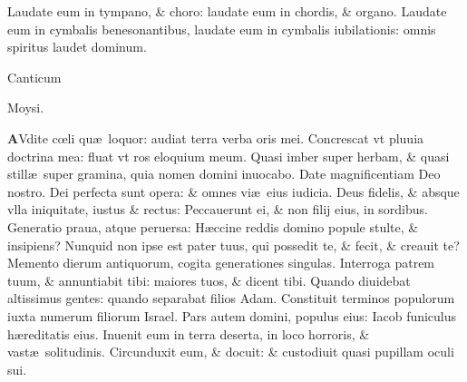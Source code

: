 \documentclass[a5paper,10pt]{book}
\def\ae{æ}
\def\oe{œ}
\begin{document}
\begin{multicols*}{2}
\newline \color{red} L\color{black}audate eum in tympano, \& choro: laudate eum in chordis, \& organo.
\newline \color{red} L\color{black}audate eum in cymbalis benesonantibus, laudate eum in cymbalis iubilationis: omnis spiritus laudet dominum.
\vspace{-2.25em}
\begin{center} \color{red}
\hypertarget{Auditecoeli}{Canticum} Moysi.
\end{center}
\vspace{-1em}
\lettrine[lines=2]{\bfseries \color{red} A}{}Vdite c\oe li qu\ae \ loquor: audiat terra verba oris mei.
\newline \color{red} C\color{black}oncrescat vt pluuia doctrina mea: fluat vt ros eloquium meum.
\newline \color{red} Q\color{black}uasi imber super herbam, \& quasi still\ae \ super gramina, quia nomen domini inuocabo.
\newline \color{red} D\color{black}ate magnificentiam Deo nostro. Dei perfecta sunt opera: \& omnes vi\ae \ eius iudicia.
\newline \color{red} D\color{black}eus fidelis, \& absque vlla iniquitate, iustus \& rectus: Peccauerunt ei, \& non filij eius, in sordibus.
\newline \color{red} G\color{black}eneratio praua, atque peruersa: H\ae ccine reddis domino popule stulte, \& insipiens?
\newline \color{red} N\color{black}unquid non ipse est pater tuus, qui possedit te, \& fecit, \& creauit te?
\newline \color{red} M\color{black}emento dierum antiquorum, cogita generationes singulas.
\newline \color{red} I\color{black}nterroga patrem tuum, \& annuntiabit tibi: maiores tuos, \& dicent tibi.
\newline \color{red} Q\color{black}uando diuidebat altissimus gentes: quando separabat filios Adam.
\newline \color{red} C\color{black}onstituit terminos populorum iuxta numerum filiorum Israel.
\newline \color{red} P\color{black}ars autem domini, populus eius: Iacob funiculus h\ae reditatis eius.
\newline \color{red} I\color{black}nuenit eum in terra deserta, in loco horroris, \& vast\ae \ solitudinis.
\newline \color{red} C\color{black}ircunduxit eum, \& docuit: \& custodiuit quasi pupillam oculi sui.

\end{multicols*}
\end{document}
